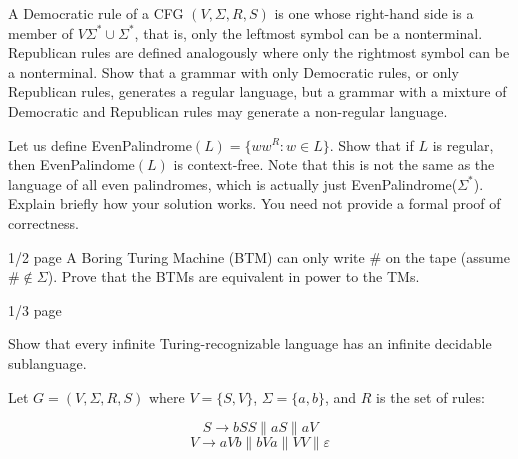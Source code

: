 \documentclass[solution, letterpaper]{cscie121}
\begin{document}
\begin{solution}
\end{solution}



A Democratic rule of a CFG $(V, \Sigma, R, S)$ is one whose right-hand side is a member of $V\Sigma^*\cup\Sigma^*$, that is, only the leftmost symbol can be a nonterminal. Republican rules are defined analogously where only the rightmost symbol can be a nonterminal. Show that a grammar with only Democratic rules, or only Republican rules, generates a regular language, but a grammar with a mixture of Democratic and Republican rules may generate a non-regular language.

\begin{solution}
\end{solution}

 Let us define EvenPalindrome$(L)=\{ww^{R} : w \in
L\}$. Show that if $L$ is regular, then EvenPalindome$(L)$ is
context-free.  Note that this is not the same as the language of all even palindromes, which is actually just EvenPalindrome($\Sigma^*$). Explain briefly how your solution works. You need not provide a formal proof of correctness.

\begin{solution}
\end{solution}


 {1/2 page}
A Boring Turing Machine (BTM) can only write $\#$ on the tape (assume $\# \notin \Sigma$). 
Prove that the BTMs are equivalent in power to the TMs.

\begin{solution}
\end{solution}

 {1/3 page}

\noindent Show that every infinite Turing-recognizable language
has an infinite decidable sublanguage.

\begin{solution}
\end{solution}




Let $G = (V, \Sigma, R, S)$ where $V=\{S,V\}$, $\Sigma = \{a,b\}$, and $R$ is the set of rules: 

$$ 
S \rightarrow bSS \| aS \| aV $$
$$ V \rightarrow aVb \| bVa \| VV \| \varepsilon 
$$
\end{document}

